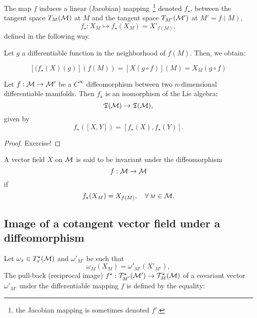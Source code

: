 The map $f$ induces a linear (Jacobian) mapping~\footnote {the Jacobian mapping is sometimes denoted $f'$.} denoted $f_{\star}$, between the tangent space  $T_{\scriptstyle M}(\mathcal{M})$ at ${\scriptstyle M}$ and the tangent space $T_{\scriptstyle M'}(\mathcal{M}')$ at ${\scriptstyle M'}=f({\scriptstyle M})$, 
 \[
  f_{\star} : X_{\scriptstyle M}\mapsto f_{\star}(X_{\scriptstyle M})=X'_{f({\scriptstyle M})},
  \]
   defined in the following way.
   
 Let $g$ a differentiable function in the neighborhood of $f({\scriptstyle M})$. Then, we obtain:  
 
 \begin{equation}\label{E:fstar}
[(f_{\star}(X)(g)](f({\scriptstyle M}))= [X(g\circ f)]({\scriptstyle M}) =X_{\scriptstyle M} (g\circ f)
\end{equation}
\begin{theorem}
Let $f:\mathcal{M} \to \mathcal{M}'$ be a $C^\infty$ diffeomorphism between two $n$-dimensional differentiable manifolds. Then $f_{\star}$ is an isomorphism of the Lie algebra: $$ \mathfrak{T}(\mathcal{M})\to\mathfrak{T}(\mathcal{M}),$$ given by 
\begin{equation}
f_{\star}([X,Y])=[f_{\star}(X),f_{\star}(Y)].
\end{equation}
\end{theorem}

\begin{proof}
Exercise!
\end{proof}


\begin{definition}
A vector field $X$ on $\mathcal{M}$ is said to be invariant under the diffeomorphism \[f:\mathcal{M} \to\mathcal{M}\] if
\begin{equation}\label{E:invecfield}
f_{\star}(X_{\scriptstyle M})=X_{f({\scriptstyle M})},\quad \forall\, {\scriptstyle M}\in \mathcal{M}.
\end{equation}
\end{definition}

\subsection{Image of a cotangent vector field under a diffeomorphism}
Let $\omega_x\in  T^{\star}_x(\mathcal{M})$ and $\omega'_{\scriptstyle M'}$ be such that
\[
\omega_{\scriptstyle M} (X_{\scriptstyle M})= \omega'_{\scriptstyle M'}(X'_{\scriptstyle M'}),
\]
The pull-back (reciprocal image) $f^{\star}: \mathcal{T}^{\star}_{\scriptstyle M'}(\mathcal{M}') \to \mathcal{T}^{\star}_{\scriptstyle M} (\mathcal{M})$ of a covariant vector $\omega'_{\scriptstyle M'}$ under the differentiable mapping $f$ is defined by the equality:

